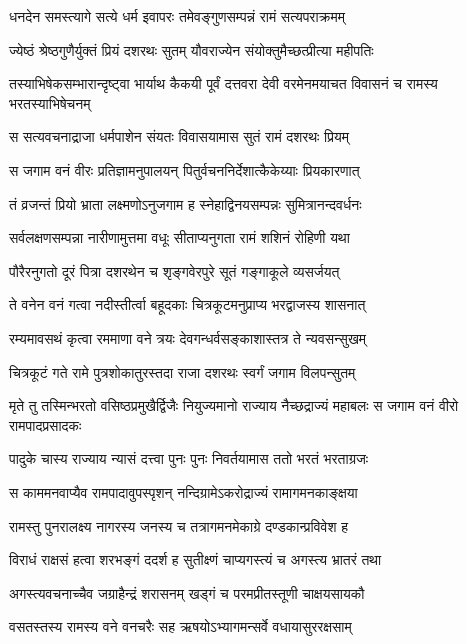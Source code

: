 \twolineshloka
{धनदेन समस्त्यागे सत्ये धर्म इवापरः}
{तमेवङ्गुणसम्पन्नं रामं सत्यपराक्रमम्} %

\twolineshloka
{ज्येष्ठं श्रेष्ठगुणैर्युक्तं प्रियं दशरथः सुतम्}
{यौवराज्येन संयोक्तुमैच्छत्प्रीत्या महीपतिः} %

\threelineshloka
{तस्याभिषेकसम्भारान्दृष्ट्वा भार्याथ कैकयी}
{पूर्वं दत्तवरा देवी वरमेनमयाचत}
{विवासनं च रामस्य भरतस्याभिषेचनम्} %

\twolineshloka
{स सत्यवचनाद्राजा धर्मपाशेन संयतः}
{विवासयामास सुतं रामं दशरथः प्रियम्} %

\twolineshloka
{स जगाम वनं वीरः प्रतिज्ञामनुपालयन्}
{पितुर्वचननिर्देशात्कैकेय्याः प्रियकारणात्} %

\twolineshloka
{तं व्रजन्तं प्रियो भ्राता लक्ष्मणोऽनुजगाम ह}
{स्नेहाद्विनयसम्पन्नः सुमित्रानन्दवर्धनः} %

\twolineshloka
{सर्वलक्षणसम्पन्ना नारीणामुत्तमा वधूः}
{सीताप्यनुगता रामं शशिनं रोहिणी यथा} %

\twolineshloka
{पौरैरनुगतो दूरं पित्रा दशरथेन च}
{शृङ्गवेरपुरे सूतं गङ्गाकूले व्यसर्जयत्} %

\twolineshloka
{ते वनेन वनं गत्वा नदीस्तीर्त्वा बहूदकाः}
{चित्रकूटमनुप्राप्य भरद्वाजस्य शासनात्} %

\twolineshloka
{रम्यमावसथं कृत्वा रममाणा वने त्रयः}
{देवगन्धर्वसङ्काशास्तत्र ते न्यवसन्सुखम्} %

\twolineshloka
{चित्रकूटं गते रामे पुत्रशोकातुरस्तदा}
{राजा दशरथः स्वर्गं जगाम विलपन्सुतम्} %

\threelineshloka
{मृते तु तस्मिन्भरतो वसिष्ठप्रमुखैर्द्विजैः}
{नियुज्यमानो राज्याय नैच्छद्राज्यं महाबलः}
{स जगाम वनं वीरो रामपादप्रसादकः} %

\twolineshloka
{पादुके चास्य राज्याय न्यासं दत्त्वा पुनः पुनः}
{निवर्तयामास ततो भरतं भरताग्रजः} %

\twolineshloka
{स काममनवाप्यैव रामपादावुपस्पृशन्}
{नन्दिग्रामेऽकरोद्राज्यं रामागमनकाङ्क्षया} %

\twolineshloka
{रामस्तु पुनरालक्ष्य नागरस्य जनस्य च}
{तत्रागमनमेकाग्रे दण्डकान्प्रविवेश ह} %

\twolineshloka
{विराधं राक्षसं हत्वा शरभङ्गं ददर्श ह}
{सुतीक्ष्णं चाप्यगस्त्यं च अगस्त्य भ्रातरं तथा} %

\twolineshloka
{अगस्त्यवचनाच्चैव जग्राहैन्द्रं शरासनम्}
{खड्गं च परमप्रीतस्तूणी चाक्षयसायकौ} %

\twolineshloka
{वसतस्तस्य रामस्य वने वनचरैः सह}
{ऋषयोऽभ्यागमन्सर्वे वधायासुररक्षसाम्} %

